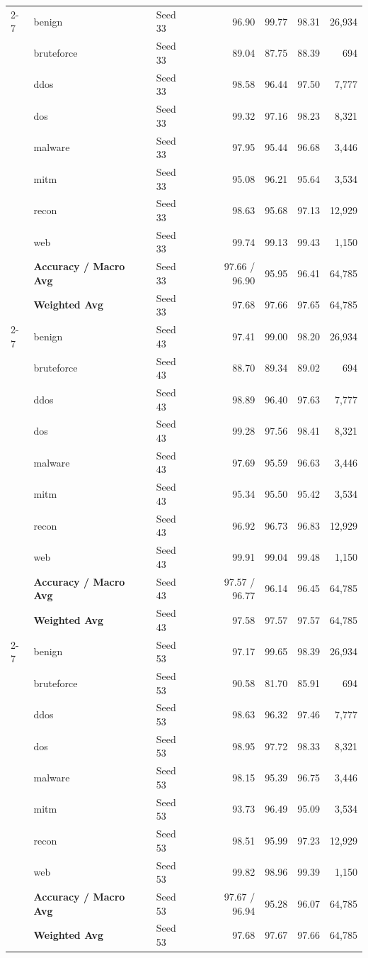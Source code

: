 \documentclass[a4paper,fleqn]{cas-sc}
\begin{document}
{\begin{landscape}
\begin{longtable}{lllrrrr}
\cline{2-7}
 & benign & Seed 33 & 96.90 & 99.77 & 98.31 & 26,934 \\
 & bruteforce & Seed 33 & 89.04 & 87.75 & 88.39 & 694 \\
 & ddos & Seed 33 & 98.58 & 96.44 & 97.50 & 7,777 \\
 & dos & Seed 33 & 99.32 & 97.16 & 98.23 & 8,321 \\
 & malware & Seed 33 & 97.95 & 95.44 & 96.68 & 3,446 \\
 & mitm & Seed 33 & 95.08 & 96.21 & 95.64 & 3,534 \\
 & recon & Seed 33 & 98.63 & 95.68 & 97.13 & 12,929 \\
 & web & Seed 33 & 99.74 & 99.13 & 99.43 & 1,150 \\
 & \textbf{Accuracy / Macro Avg} & Seed 33 & 97.66 / 96.90 & 95.95 & 96.41 & 64,785 \\
 & \textbf{Weighted Avg} & Seed 33 & 97.68 & 97.66 & 97.65 & 64,785 \\
\cline{2-7}
 & benign & Seed 43 & 97.41 & 99.00 & 98.20 & 26,934 \\
 & bruteforce & Seed 43 & 88.70 & 89.34 & 89.02 & 694 \\
 & ddos & Seed 43 & 98.89 & 96.40 & 97.63 & 7,777 \\
 & dos & Seed 43 & 99.28 & 97.56 & 98.41 & 8,321 \\
 & malware & Seed 43 & 97.69 & 95.59 & 96.63 & 3,446 \\
 & mitm & Seed 43 & 95.34 & 95.50 & 95.42 & 3,534 \\
 & recon & Seed 43 & 96.92 & 96.73 & 96.83 & 12,929 \\
 & web & Seed 43 & 99.91 & 99.04 & 99.48 & 1,150 \\
 & \textbf{Accuracy / Macro Avg} & Seed 43 & 97.57 / 96.77 & 96.14 & 96.45 & 64,785 \\
 & \textbf{Weighted Avg} & Seed 43 & 97.58 & 97.57 & 97.57 & 64,785 \\
\cline{2-7}
 & benign & Seed 53 & 97.17 & 99.65 & 98.39 & 26,934 \\
 & bruteforce & Seed 53 & 90.58 & 81.70 & 85.91 & 694 \\
 & ddos & Seed 53 & 98.63 & 96.32 & 97.46 & 7,777 \\
 & dos & Seed 53 & 98.95 & 97.72 & 98.33 & 8,321 \\
 & malware & Seed 53 & 98.15 & 95.39 & 96.75 & 3,446 \\
 & mitm & Seed 53 & 93.73 & 96.49 & 95.09 & 3,534 \\
 & recon & Seed 53 & 98.51 & 95.99 & 97.23 & 12,929 \\
 & web & Seed 53 & 99.82 & 98.96 & 99.39 & 1,150 \\
 & \textbf{Accuracy / Macro Avg} & Seed 53 & 97.67 / 96.94 & 95.28 & 96.07 & 64,785 \\
 & \textbf{Weighted Avg} & Seed 53 & 97.68 & 97.67 & 97.66 & 64,785 \\
\bottomrule
\end{longtable}
\end{landscape}
}
\end{document}
